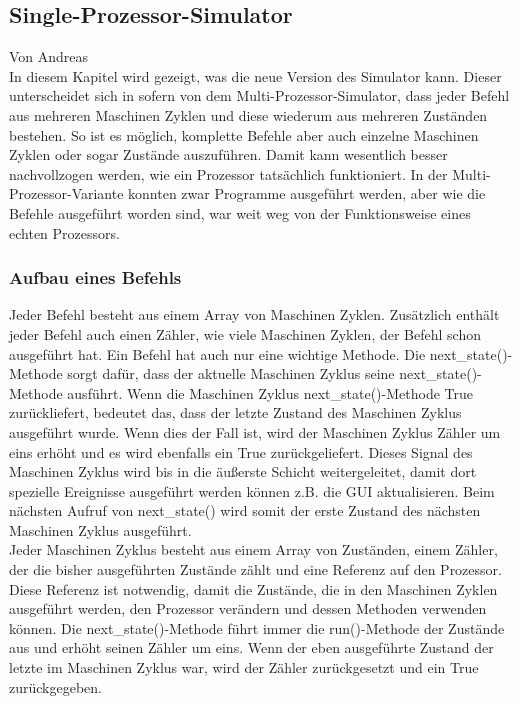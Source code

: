 \documentclass[12pt]{article}
\begin{document}
\subsection{Single-Prozessor-Simulator}
\label{SPS_impl}
Von Andreas\\

\noindent
In diesem Kapitel wird gezeigt, was die neue Version des Simulator kann. Dieser unterscheidet sich in sofern von dem Multi-Prozessor-Simulator, dass jeder Befehl aus mehreren Maschinen Zyklen und diese wiederum aus mehreren Zuständen bestehen. So ist es möglich, komplette Befehle aber auch einzelne Maschinen Zyklen oder sogar Zustände auszuführen. Damit kann wesentlich besser nachvollzogen werden, wie ein Prozessor tatsächlich funktioniert. In der Multi-Prozessor-Variante konnten zwar Programme ausgeführt werden, aber wie die Befehle ausgeführt worden sind, war weit weg von der Funktionsweise eines echten Prozessors. 

\subsubsection{Aufbau eines Befehls}

Jeder Befehl besteht aus einem Array von Maschinen Zyklen. Zusätzlich enthält jeder Befehl auch einen Zähler, wie viele Maschinen Zyklen, der Befehl schon ausgeführt hat. Ein Befehl hat auch nur eine wichtige Methode. Die next\_state()-Methode sorgt dafür, dass der aktuelle Maschinen Zyklus seine next\_state()-Methode ausführt. Wenn die Maschinen Zyklus next\_state()-Methode True zurückliefert, bedeutet das, dass der letzte Zustand des Maschinen Zyklus ausgeführt wurde. Wenn dies der Fall ist, wird der Maschinen Zyklus Zähler um eins erhöht und es wird ebenfalls ein True zurückgeliefert. Dieses Signal des Maschinen Zyklus wird bis in die äußerste Schicht weitergeleitet, damit dort spezielle Ereignisse ausgeführt werden können z.B. die GUI aktualisieren. Beim nächsten Aufruf von next\_state() wird somit der erste Zustand des nächsten Maschinen Zyklus ausgeführt.
\\

\noindent
Jeder Maschinen Zyklus besteht aus einem Array von Zuständen, einem Zähler, der die bisher ausgeführten Zustände zählt und eine Referenz auf den Prozessor. Diese Referenz ist notwendig, damit die Zustände, die in den Maschinen Zyklen ausgeführt werden, den Prozessor verändern und dessen Methoden verwenden können. Die next\_state()-Methode führt immer die run()-Methode der Zustände aus und erhöht seinen Zähler um eins. Wenn der eben ausgeführte Zustand der letzte im Maschinen Zyklus war, wird der Zähler zurückgesetzt und ein True zurückgegeben.
\\
\end{document}
